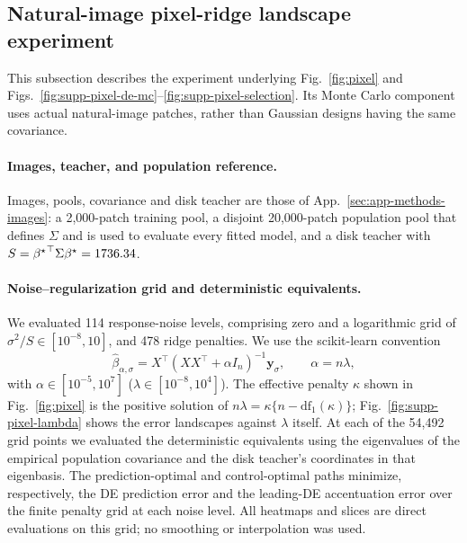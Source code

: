 \subsection{Natural-image pixel-ridge landscape experiment}
\label{sec:app-vanhateren-landscape-methods}

This subsection describes the experiment underlying Fig.~\ref{fig:pixel} and
Figs.~\ref{fig:supp-pixel-de-mc}--\ref{fig:supp-pixel-selection}.  Its
Monte Carlo component uses actual natural-image patches, rather than Gaussian
designs having the same covariance.

\paragraph{Images, teacher, and population reference.}
Images, pools, covariance and disk teacher are those of
App.~\ref{sec:app-methods-images}: a 2,000-patch training pool, a disjoint
20,000-patch population pool that defines $\Sigma$ and is used to evaluate
every fitted model, and a disk teacher with
$S={\beta^{\star}}^\top\Sigma{\beta^{\star}}=1736.34$.

\paragraph{Noise--regularization grid and deterministic equivalents.}
We evaluated 114 response-noise levels, comprising zero and a logarithmic grid
of $\sigma^2/S\in[10^{-8},10]$, and 478 ridge penalties.  We use the
scikit-learn convention
\begin{equation}
 \widehat\beta_{\alpha,\sigma}
 =X^\top(XX^\top+\alpha I_n)^{-1}\bm y_\sigma,
 \qquad \alpha=n\lambda,
\end{equation}
with $\alpha\in[10^{-5},10^7]$ ($\lambda\in[10^{-8},10^4]$).  The effective
penalty $\kappa$ shown in Fig.~\ref{fig:pixel} is the positive solution of
$n\lambda=\kappa\{n-\mathrm{df}_1(\kappa)\}$; Fig.~\ref{fig:supp-pixel-lambda}
shows the error landscapes against $\lambda$ itself.  At each of the 54,492 grid
points we evaluated the deterministic equivalents using the eigenvalues of
the empirical population covariance and the disk teacher's coordinates in
that eigenbasis.  The prediction-optimal and control-optimal paths minimize,
respectively, the DE prediction error and the leading-DE accentuation error
over the finite penalty grid at each noise level.  All heatmaps and slices
are direct evaluations on this grid; no smoothing or interpolation was used.

